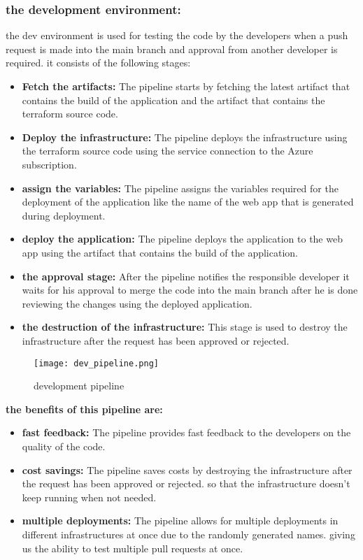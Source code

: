 \subsubsection*{the development environment:}
the dev environment is used for testing the code by the developers when a push request is made into the main branch and approval from another developer is required. it consists of the following stages:
\begin{itemize}
    \item \textbf{Fetch the artifacts:} The pipeline starts by fetching the latest artifact that contains the build of the application and the artifact that contains the terraform source code.
    \item \textbf{Deploy the infrastructure:} The pipeline deploys the infrastructure using the terraform source code using the service connection to the Azure subscription.
    \item \textbf{assign the variables:} The pipeline assigns the variables required for the deployment of the application like the name of the web app that is generated during deployment.
    \item \textbf{deploy the application:} The pipeline deploys the application to the web app using the artifact that contains the build of the application.
    \item \textbf{the approval stage:} After the pipeline notifies the responsible developer it waits for his approval to merge the code into the main branch after he is done reviewing the changes using the deployed application.
    \item \textbf{the destruction of the infrastructure:} This stage is used to destroy the infrastructure after the request has been approved or rejected.
\end{itemize}

\begin{figure}[htbp]
    \centering
    \texttt{[image: dev\_pipeline.png]}
    \caption{development pipeline}
    \label{fig:devPipeline}
\end{figure}

\textbf{the benefits of this pipeline are:}
\begin{itemize}
    \item \textbf{fast feedback:} The pipeline provides fast feedback to the developers on the quality of the code.
    \item \textbf{cost savings:} The pipeline saves costs by destroying the infrastructure after the request has been approved or rejected. so that the infrastructure doesn't keep running when not needed.
    \item \textbf{multiple deployments:} The pipeline allows for multiple deployments in different infrastructures at once due to the randomly generated names. giving us the ability to test multiple pull requests at once.
\end{itemize}
